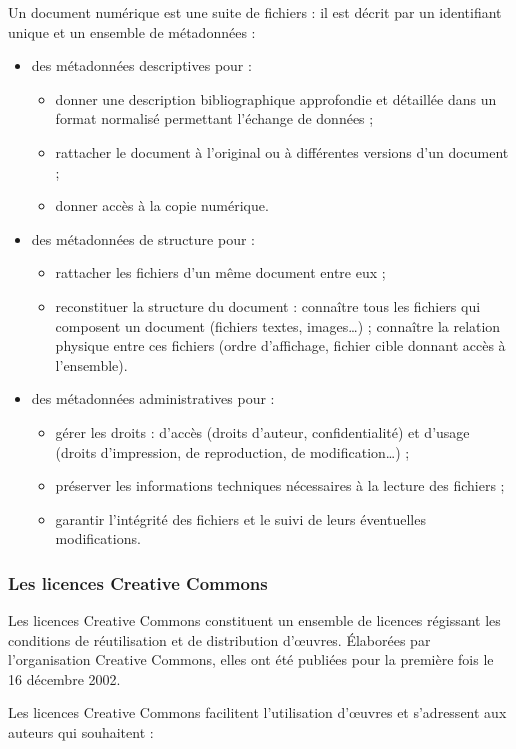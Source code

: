 \documentclass[12pt]{report}
\begin{document}
Un document numérique est une suite de fichiers : il est décrit par un identifiant unique et un ensemble de métadonnées :
\begin{itemize}
\item des métadonnées descriptives pour :
\begin{itemize}
\item donner une description bibliographique approfondie et détaillée dans un format normalisé permettant l’échange de données ;
\item rattacher le document à l’original ou à différentes versions d’un document ;
\item donner accès à la copie numérique.
\end{itemize}
\item des métadonnées de structure pour :
\begin{itemize}
\item rattacher les fichiers d’un même document entre eux ;
\item reconstituer la structure du document : connaître tous les fichiers qui composent un document (fichiers textes, images…) ; connaître la relation physique entre ces fichiers (ordre d’affichage, fichier cible donnant accès à l’ensemble).
\end{itemize}
\item des métadonnées administratives pour :
\begin{itemize}
\item gérer les droits : d’accès (droits d’auteur, confidentialité) et d’usage (droits d’impression, de reproduction, de modification…) ;
\item préserver les informations techniques nécessaires à la lecture des fichiers ;
\item garantir l’intégrité des fichiers et le suivi de leurs éventuelles modifications.
\end{itemize}
\end{itemize}


\subsubsection{Les licences Creative Commons}

Les licences Creative Commons constituent un ensemble de licences régissant les conditions de réutilisation et de distribution d'œuvres. Élaborées par l'organisation Creative Commons, elles ont été publiées pour la première fois le 16 décembre 2002.

Les licences Creative Commons facilitent l'utilisation d’œuvres et s'adressent aux auteurs qui souhaitent :
\end{document}

